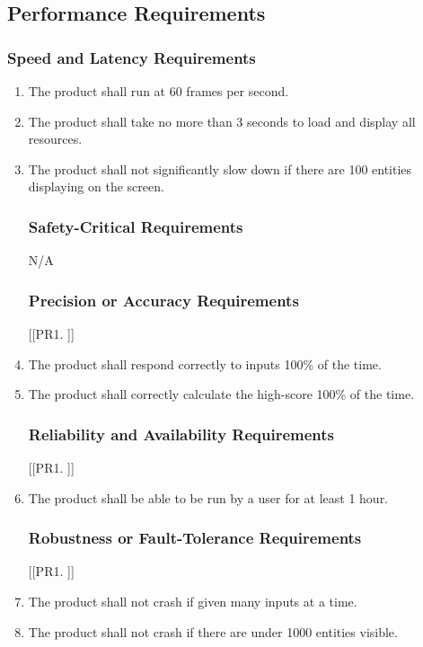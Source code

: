 \documentclass[12pt, titlepage]{article}
\begin{document}
\subsection{Performance Requirements}

\subsubsection{Speed and Latency Requirements}
\begin{enumerate}[{PR}1. ]
    \item The product shall run at 60 frames per second.
    \item The product shall take no more than 3 seconds to load and display all resources.
    \item The product shall not significantly slow down if there are 100 entities displaying on the screen.

\subsubsection{Safety-Critical Requirements}
N/A

\subsubsection{Precision or Accuracy Requirements}
[{[{PR}1. ]}]
    \item The product shall respond correctly to inputs 100\% of the time.
    \item The product shall correctly calculate the high-score 100\% of the time.

\subsubsection{Reliability and Availability Requirements}
[{[{PR}1. ]}]
    \item The product shall be able to be run by a user for at least 1 hour.

\subsubsection{Robustness or Fault-Tolerance Requirements}
[{[{PR}1. ]}]
    \item The product shall not crash if given many inputs at a time.
    \item The product shall not crash if there are under 1000 entities visible.


\end{enumerate}
\end{document}
